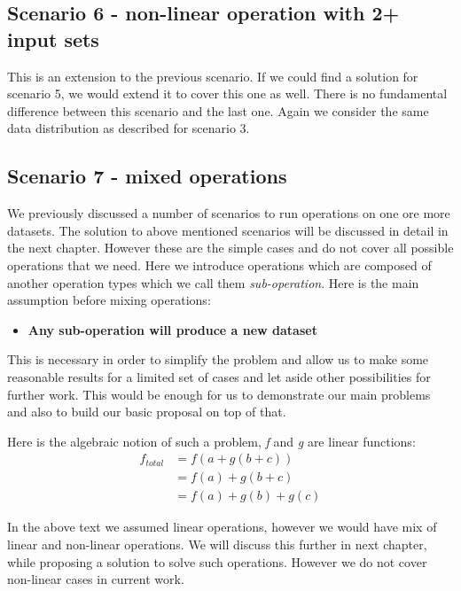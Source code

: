 \subsection{Scenario 6 - non-linear operation with 2+ input sets}
This is an extension to the previous scenario. 
If we could find a solution for scenario 5, we would extend it to cover this one as well. 
There is no fundamental difference between this scenario and the last one. Again we consider the same
data distribution as described for scenario 3.

\subsection{Scenario 7 - mixed operations}
We previously discussed a number of scenarios to run operations on one ore more datasets. The solution to 
above mentioned scenarios will be discussed in detail in the next chapter. However these are the simple cases and
do not cover all possible operations that we need. Here we introduce operations which are composed of another
operation types which we call them \textit{sub-operation}.
Here is the main assumption before mixing operations:

\begin{itemize}
\item \textbf{Any sub-operation will produce a new dataset}
\end{itemize}

This is necessary in order to simplify the problem and allow us to make some reasonable results
for a limited set of cases and let aside other possibilities for further work. This would be enough
for us to demonstrate our main problems and also to build our basic proposal on top of that.

Here is the algebraic notion of such a problem, \textit{f} and \textit{g} are linear functions:
\begin{subequations}
\begin{align*}
f_{total} &= f(a + g(b + c))\\
&= f(a) + g(b + c)\\
&= f(a) + g(b) + g(c)
\end{align*}
\end{subequations}

In the above text we assumed linear operations, however we would have mix of linear and non-linear operations. 
We will discuss this further in next chapter, 
while proposing a solution to solve such operations. However we do not cover non-linear cases in current work.

